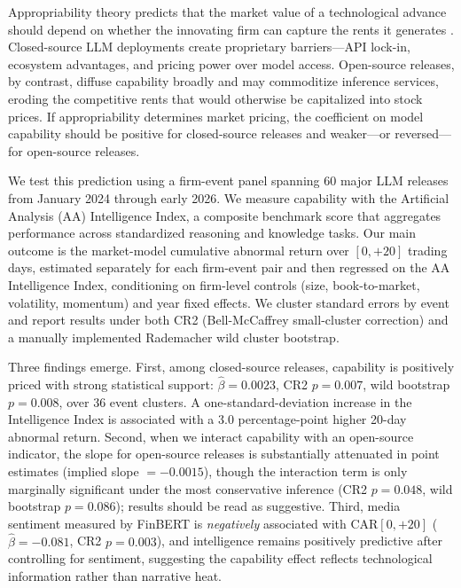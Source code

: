 \documentclass[12pt]{article}
\begin{document}
Appropriability theory predicts that the market value of a technological advance
should depend on whether the innovating firm can capture the rents it generates
\citep{Teece1986}. Closed-source LLM deployments create proprietary
barriers---API lock-in, ecosystem advantages, and pricing power over model
access. Open-source releases, by contrast, diffuse capability broadly and may
commoditize inference services, eroding the competitive rents that would otherwise
be capitalized into stock prices. If appropriability determines market pricing,
the coefficient on model capability should be positive for closed-source releases
and weaker---or reversed---for open-source releases.

We test this prediction using a firm-event panel spanning 60 major LLM releases
from January 2024 through early 2026. We measure capability with the Artificial
Analysis (AA) Intelligence Index, a composite benchmark score that aggregates
performance across standardized reasoning and knowledge tasks. Our main outcome
is the market-model cumulative abnormal return over $[0,{+}20]$ trading days,
estimated separately for each firm-event pair and then regressed on the AA
Intelligence Index, conditioning on firm-level controls (size, book-to-market,
volatility, momentum) and year fixed effects. We cluster standard errors by event
and report results under both CR2 (Bell-McCaffrey small-cluster correction) and a
manually implemented Rademacher wild cluster bootstrap.

Three findings emerge. First, among closed-source releases, capability is
positively priced with strong statistical support: $\hat{\beta} = 0.0023$, CR2
$p = 0.007$, wild bootstrap $p = 0.008$, over 36 event clusters. A
one-standard-deviation increase in the Intelligence Index is associated with a
3.0 percentage-point higher 20-day abnormal return. Second, when we interact
capability with an open-source indicator, the slope for open-source releases is
substantially attenuated in point estimates (implied slope $= -0.0015$), though
the interaction term is only marginally significant under the most conservative
inference (CR2 $p = 0.048$, wild bootstrap $p = 0.086$); results should be read
as suggestive. Third, media sentiment measured by FinBERT is \emph{negatively}
associated with CAR$[0,{+}20]$ ($\hat{\beta} = -0.081$, CR2 $p = 0.003$), and
intelligence remains positively predictive after controlling for sentiment,
suggesting the capability effect reflects technological information rather than
narrative heat.
\end{document}

